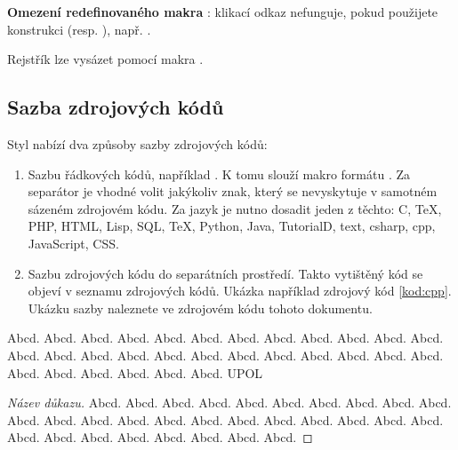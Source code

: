 \documentclass[
  biblatex,
  glossaries,
  index
]{kidiplom}
\begin{document}
\textbf{Omezení redefinovaného makra }: klikací odkaz nefunguje, pokud použijete konstrukci  (resp. ), např. .

Rejstřík lze vysázet pomocí makra .

\subsection{Sazba zdrojových kódů}
Styl nabízí dva způsoby sazby zdrojových kódů:

\begin{enumerate}
  \item Sazbu řádkových kódů, například . K tomu slouží makro formátu . Za separátor je vhodné volit jakýkoliv znak, který se nevyskytuje v samotném sázeném zdrojovém kódu. Za jazyk je nutno dosadit jeden z těchto: C, TeX, PHP, HTML, Lisp, SQL, TeX, Python, Java, TutorialD, text, csharp, cpp, JavaScript, CSS.

  \item Sazbu zdrojových kódu do separátních prostředí. Takto vytištěný kód se objeví v seznamu zdrojových kódů. Ukázka například zdrojový kód \ref{kod:cpp}. Ukázku sazby naleznete ve zdrojovém kódu tohoto dokumentu.
\end{enumerate}


\begin{definition}
  Abcd. Abcd. Abcd. Abcd. Abcd. Abcd. Abcd. Abcd. Abcd. Abcd. Abcd. Abcd. Abcd. Abcd. Abcd. Abcd. Abcd. Abcd. Abcd. Abcd. Abcd. Abcd. Abcd. Abcd. Abcd. Abcd. Abcd. Abcd. Abcd. Abcd. \gls{UPOL}
\end{definition}

\begin{proof}[Název důkazu]
  Abcd. Abcd. Abcd. Abcd. Abcd. Abcd. Abcd. Abcd. Abcd. Abcd. Abcd. Abcd. Abcd. Abcd. Abcd. Abcd. Abcd. Abcd. Abcd. Abcd. Abcd. Abcd. Abcd. Abcd. Abcd. Abcd. Abcd. Abcd. Abcd. Abcd.
\end{proof}
\end{document}
